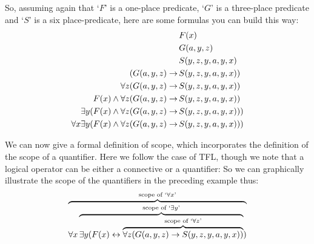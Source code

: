 So, assuming again that `$F$' is a one-place predicate, `$G$' is a three-place predicate and `$S$' is a six place-predicate, here are some formulas you can build this way:
	\begin{align*}
		& F(x)\\
		& G(a,y,z)\\
		& S(y,z,y,a,y,x)\\
		(G(a,y,z) \rightarrow \,& S(y,z,y,a,y,x))\\
		\forall z (G(a,y,z) \rightarrow \,& S(y,z,y,a,y,x))\\
		F(x) \wedge \forall z (G(a,y,z) \rightarrow \,& S(y,z,y,a,y,x))\\
		\exists y (F(x) \wedge \forall z (G(a,y,z) \rightarrow \,& S(y,z,y,a,y,x)))\\
		\forall x \exists y (F(x) \wedge \forall z (G(a,y,z) \rightarrow \,& S(y,z,y,a,y,x)))
	\end{align*}

We can now give a formal definition of scope, which incorporates the definition of the scope of a quantifier. Here we follow the case of TFL, though we note that a logical operator can be either a connective or a quantifier:
So we can graphically illustrate the scope of the quantifiers in the
preceding example thus:
$$\overbrace{\forall x \overbrace{\exists y (F(x) \leftrightarrow
\overbrace{\forall z (G(a,y,z) \rightarrow
S(y,z,y,a,y,x))}^{\text{scope of `}\forall
z\text{'}}}^{\text{scope of `}\exists y\text{'}})}^{\text{scope of
`$\forall x$'}}$$

